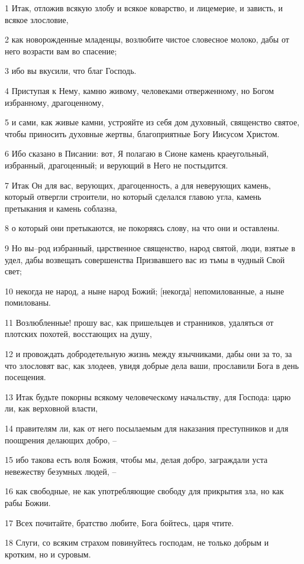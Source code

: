 \par 1 Итак, отложив всякую злобу и всякое коварство, и лицемерие, и зависть, и всякое злословие,
\par 2 как новорожденные младенцы, возлюбите чистое словесное молоко, дабы от него возрасти вам во спасение;
\par 3 ибо вы вкусили, что благ Господь.
\par 4 Приступая к Нему, камню живому, человеками отверженному, но Богом избранному, драгоценному,
\par 5 и сами, как живые камни, устрояйте из себя дом духовный, священство святое, чтобы приносить духовные жертвы, благоприятные Богу Иисусом Христом.
\par 6 Ибо сказано в Писании: вот, Я полагаю в Сионе камень краеугольный, избранный, драгоценный; и верующий в Него не постыдится.
\par 7 Итак Он для вас, верующих, драгоценность, а для неверующих камень, который отвергли строители, но который сделался главою угла, камень претыкания и камень соблазна,
\par 8 о который они претыкаются, не покоряясь слову, на что они и оставлены.
\par 9 Но вы--род избранный, царственное священство, народ святой, люди, взятые в удел, дабы возвещать совершенства Призвавшего вас из тьмы в чудный Свой свет;
\par 10 некогда не народ, а ныне народ Божий; [некогда] непомилованные, а ныне помилованы.
\par 11 Возлюбленные! прошу вас, как пришельцев и странников, удаляться от плотских похотей, восстающих на душу,
\par 12 и провождать добродетельную жизнь между язычниками, дабы они за то, за что злословят вас, как злодеев, увидя добрые дела ваши, прославили Бога в день посещения.
\par 13 Итак будьте покорны всякому человеческому начальству, для Господа: царю ли, как верховной власти,
\par 14 правителям ли, как от него посылаемым для наказания преступников и для поощрения делающих добро, --
\par 15 ибо такова есть воля Божия, чтобы мы, делая добро, заграждали уста невежеству безумных людей, --
\par 16 как свободные, не как употребляющие свободу для прикрытия зла, но как рабы Божии.
\par 17 Всех почитайте, братство любите, Бога бойтесь, царя чтите.
\par 18 Слуги, со всяким страхом повинуйтесь господам, не только добрым и кротким, но и суровым.
